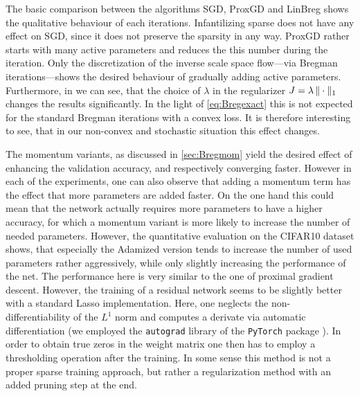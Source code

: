 The basic comparison between the  algorithms SGD, ProxGD and LinBreg shows the qualitative behaviour of each iterations. Infantilizing sparse does not have any effect on SGD, since it does not preserve the sparsity in any way. ProxGD rather starts with many active parameters and reduces the this number during the iteration. Only the discretization of the inverse scale space flow---via Bregman iterations---shows the desired behaviour of gradually adding active parameters. Furthermore, in \cite[Fig. 2]{bungert2022bregman} we can see, that the choice of $\lambda$ in the regularizer $J = \lambda\, \|\cdot\|_1$ changes the results significantly. In the light of \cref{eq:Bregexact} this is not expected for the standard Bregman iterations with a convex loss. It is therefore interesting to see, that in our non-convex and stochastic situation this effect changes.

The momentum variants, as discussed in \cref{sec:Bregmom} yield the desired effect of enhancing the validation accuracy, and respectively converging faster. However in each  of the experiments, one can also observe that adding a momentum term has the effect that more parameters are added faster. On the one hand this could mean that the network actually requires more parameters to have a higher accuracy, for which a momentum variant is more likely to increase the number of needed parameters. However, the quantitative evaluation on the CIFAR10 dataset \cite{krizhevsky2009learning} shows, that especially the Adamized version tends to increase the number of used parameters rather aggressively, while only slightly increasing the performance of the net. The performance here is very similar to the one of proximal gradient descent. However, the training of a residual network seems to be slightly better with a standard Lasso implementation. Here, one neglects the non-differentiability of the $L^1$ norm and computes a derivate via automatic differentiation \cite{rall1981automatic, maclaurin2015autograd} (we employed the \texttt{autograd} library of the \texttt{PyTorch} package \cite{paszke2019pytorch}). In order to obtain true zeros in the weight matrix one then has to employ a thresholding operation after the training. In some sense this method is not a proper sparse training approach, but rather a regularization method with an added pruning step at the end.

